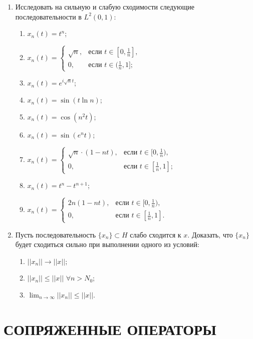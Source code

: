\documentclass[12pt,a4paper]{article}
\begin{document}
\begin{enumerate}
\item Исследовать на сильную и слабую сходимости следующие последовательности в $L^{2}(0,1)$:
\begin{enumerate}[label=\alph*)]
\item $x_{n}(t) = t^{n}$;
\item $x_{n}(t) =
\begin{cases} \sqrt{n}, & \text{если } t \in [0, \frac{1}{n}], \\ 0, & \text{если } t \in (\frac{1}{n}, 1];
\end{cases}$
\item $x_{n}(t) = e^{i\sqrt{n}t}$;
\item $x_{n}(t) = \sin(t \ln n)$;
\item $x_{n}(t) = \cos(n^{2}t)$;
\item $x_{n}(t) = \sin(e^{n}t)$;
\item $x_{n}(t) =
\begin{cases} \sqrt{n} \cdot (1 - nt), & \text{если } t \in [0, \frac{1}{n}), \\ 0, & \text{если } t \in [\frac{1}{n}, 1];
\end{cases}$
\item $x_{n}(t) = t^{n} - t^{n+1}$;
\item $x_{n}(t) =
\begin{cases} 2n(1 - nt), & \text{если } t \in [0, \frac{1}{n}), \\ 0, & \text{если } t \in [\frac{1}{n}, 1].
\end{cases}$
\end{enumerate}

\item Пусть последовательность $\{x_{n}\} \subset H$ слабо сходится к $x$. Доказать, что $\{x_{n}\}$ будет сходиться сильно при выполнении одного из условий:
\begin{enumerate}[label=\alph*)]
\item $||x_{n}|| \rightarrow ||x||$;
\item $||x_{n}|| \le ||x||$ $\forall n > N_{0}$;
\item $\lim_{n \rightarrow \infty} ||x_{n}|| \le ||x||$.
\end{enumerate}
\end{enumerate}

\section{СОПРЯЖЕННЫЕ ОПЕРАТОРЫ}
\end{document}
